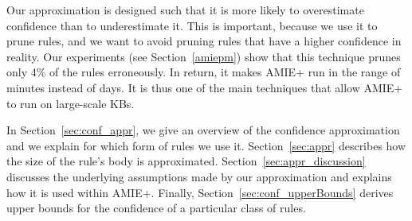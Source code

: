 Our approximation is designed such that it is more likely to overestimate confidence than to underestimate it.
This is important, because we use it to prune rules, and we want to avoid pruning rules that have a higher confidence in reality.
Our experiments (see Section~\ref{amiepm}) show that this technique prunes only 4\% of the rules erroneously. In return, it makes AMIE+ run in the range of minutes instead of days. It is thus one of the main techniques that allow AMIE+ to run on large-scale KBs.

In Section~\ref{sec:conf_appr}, we give an overview of the confidence approximation and we explain for which form of rules we use it.
Section~\ref{sec:appr} describes how the size of the rule's body is approximated.
Section~\ref{sec:appr_discussion} discusses the underlying assumptions made by our approximation and explains how it is used within AMIE+.
Finally, Section~\ref{sec:conf_upperBounds} derives upper bounds for the confidence of a particular class of rules.




